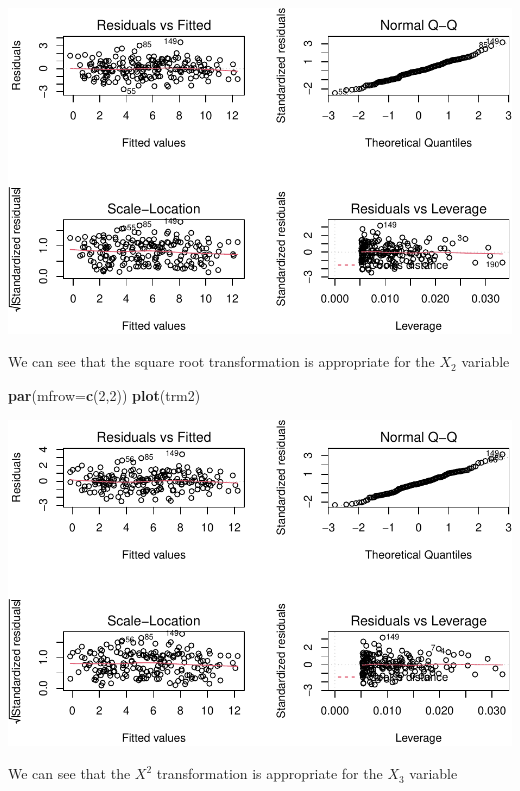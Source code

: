 \documentclass[]{article}
\newenvironment{Shaded}{\begin{snugshade}}{\end{snugshade}}
\newcommand{\DataTypeTok}[1]{\textcolor[rgb]{0.13,0.29,0.53}{#1}}
\newcommand{\DecValTok}[1]{\textcolor[rgb]{0.00,0.00,0.81}{#1}}
\newcommand{\KeywordTok}[1]{\textcolor[rgb]{0.13,0.29,0.53}{\textbf{#1}}}
\newcommand{\NormalTok}[1]{#1}
\begin{document}
\includegraphics{./figures/unnamed-chunk-29-1.pdf}

We can see that the square root transformation is appropriate for the
\(X_{2}\) variable

\newpage

\begin{Shaded}
\begin{Highlighting}[]
\KeywordTok{par}\NormalTok{(}\DataTypeTok{mfrow=}\KeywordTok{c}\NormalTok{(}\DecValTok{2}\NormalTok{,}\DecValTok{2}\NormalTok{))}
\KeywordTok{plot}\NormalTok{(trm2)}
\end{Highlighting}
\end{Shaded}

\includegraphics{./figures/unnamed-chunk-30-1.pdf}

We can see that the \(X^{2}\) transformation is appropriate for the
\(X_{3}\) variable

\newpage
\end{document}
